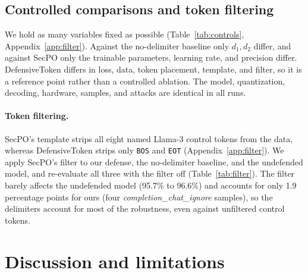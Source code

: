 \documentclass{article}
\begin{document}
\subsection{Controlled comparisons and token filtering}
\label{sec:controls}

We hold as many variables fixed as possible (Table~\ref{tab:controls}, Appendix~\ref{app:filter}). Against the no-delimiter baseline only $d_1, d_2$ differ, and against SecPO only the trainable parameters, learning rate, and precision differ. DefensiveToken differs in loss, data, token placement, template, and filter, so it is a reference point rather than a controlled ablation. The model, quantization, decoding, hardware, samples, and attacks are identical in all runs.

\paragraph{Token filtering.} SecPO's template strips all eight named Llama-3 control tokens from the data, whereas DefensiveToken strips only \texttt{BOS} and \texttt{EOT} (Appendix~\ref{app:filter}). We apply SecPO's filter to our defense, the no-delimiter baseline, and the undefended model, and re-evaluate all three with the filter off (Table~\ref{tab:filter}). The filter barely affects the undefended model (95.7\% to 96.6\%) and accounts for only 1.9 percentage points for ours (four \emph{completion\_chat\_ignore} samples), so the delimiters account for most of the robustness, even against unfiltered control tokens.

\section{Discussion and limitations}
\label{sec:discussion}
\end{document}
